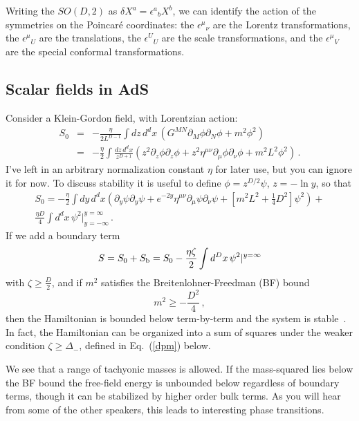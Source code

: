 \documentclass[12pt]{article}
\begin{document}
{Writing the $SO(D,2)$ as $\delta X^a = \epsilon^a\!_b X^b$, we can identify the action of the symmetries on the Poincar\'e coordinates: the $\epsilon^\mu\!_\nu$ are the Lorentz transformations, the  $\epsilon^\mu\!_U$ are the translations, the $\epsilon^U\!_U$ are the scale transformations, and the $\epsilon^\mu\!_V$ are the special conformal transformations.

\subsection{Scalar fields in AdS}

Consider a Klein-Gordon field, with Lorentzian action:
\begin{eqnarray}
S_0 &=& -\frac{\eta}{2L^{D-1}} \int dz\, d^dx\,( G^{MN} \partial_M \phi \partial_N \phi + m^2 \phi^2) 
\nonumber\\
&=&
-\frac{\eta}{2} \int \frac{dz\, d^dx}{z^{D+1}} \left( z^2 \partial_z \phi  \partial_z \phi
+ z^2 \eta^{\mu\nu} \partial_\mu \phi \partial_\nu \phi + m^2 L^2 \phi^2 \right) \,.
\end{eqnarray}
I've left in an arbitrary normalization constant $\eta$ for later use, but you can ignore it for now.
To discuss stability it is useful to define $\phi = z^{D/2}\psi$, $z = -\ln y$, so that
\begin{multline}
S_0 = -\frac{\eta}{2} \int{dy\, d^dx} \left(\partial_y \psi  \partial_y \psi
+ e^{-2y} \eta^{\mu\nu} \partial_\mu \psi \partial_\nu \psi + [m^2 L^2 + {\textstyle \frac14} D^2]  \psi^2 \right)  + \\
\frac{\eta D}{4}  \int{d^dx}\, \psi^2 \Big|^{y = \infty}_{y = -\infty} \,.
\end{multline}
If we add a boundary term
\begin{equation}
S = S_0 + S_{\rm b} =  S_0 - \frac{ \eta\zeta}{2}  \int{d^Dx}\, \psi^2 |^{y = \infty} \label{bact}
\end{equation}
with $\zeta \geq \frac{D}{2}$,  and if $m^2$ satisfies the Breitenlohner-Freedman (BF) bound 
\begin{equation}
m^2 \geq -\frac{D^2}{4} \,,
\end{equation}
then the Hamiltonian is bounded below term-by-term and the system is stable~\cite{Breitenlohner:1982bm}.   In fact, the Hamiltonian can be organized into a sum of squares under the weaker condition $\zeta \geq \Delta_-$, defined in Eq.~(\ref{dpm}) below.

We see that a range of tachyonic masses is allowed.  If the mass-squared lies below the BF bound the free-field energy is unbounded below regardless of boundary terms, though it can be stabilized by higher order bulk terms.  As you will hear from some of the other speakers, this leads to interesting phase transitions.

}
\end{document}
